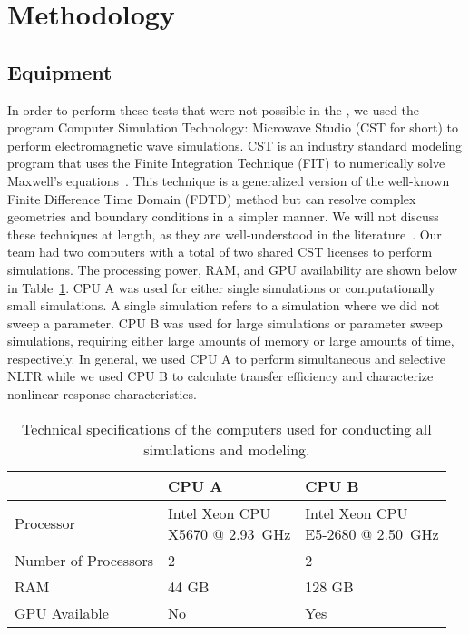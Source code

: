 \section{Methodology}
\label{sec:numerical-meth}

\subsection{Equipment}
In order to perform these tests that were not possible in the \giga, we used the program Computer Simulation Technology: Microwave Studio (CST for short) to perform electromagnetic wave simulations. CST is an industry standard modeling program that uses the Finite Integration Technique (FIT) to numerically solve Maxwell's equations~\cite{computersimulationtechnology}. This technique is a generalized version of the well-known Finite Difference Time Domain (FDTD) method but can resolve complex geometries and boundary conditions in a simpler manner. We will not discuss these techniques at length, as they are well-understood in the literature~\cite{schneider2010understanding,weiland2001discrete}.
Our team had two computers with a total of two shared CST licenses to perform simulations. The processing power, RAM, and GPU availability are shown below in Table~\ref{tab:numerical-cpu-specs}. CPU A was used for either single simulations or computationally small simulations. A single simulation refers to a simulation where we did not sweep a parameter.  CPU B was used for large simulations or parameter sweep simulations, requiring either large amounts of memory or large amounts of time, respectively. In general, we used CPU A to perform simultaneous and selective NLTR while we used CPU B to calculate transfer efficiency and characterize nonlinear response characteristics.

\def\arraystretch{2}
\begin{table}[h]
\centering
\begin{tabular}{|l|l|l|}
\hline
 & \textbf{CPU A} & \textbf{CPU B} \\ \hline
Processor & \rule{0pt}{2.5em}\shortstack{Intel Xeon CPU \\ X5670 @ 2.93~GHz} & \rule{0pt}{2.5em}\shortstack{Intel Xeon CPU \\ E5-2680 @ 2.50~GHz} \\ \hline
Number of Processors & 2 & 2 \\ \hline
RAM & 44 GB & 128 GB \\ \hline
GPU Available & No & Yes \\ \hline
\end{tabular}
\caption[Computer specifications]{Technical specifications of the computers used for conducting all simulations and modeling.}
\label{tab:numerical-cpu-specs}
\end{table}

